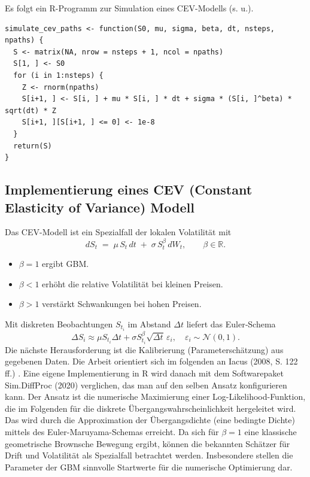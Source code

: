 \begin{bsp}[Implementierung]
Es folgt ein R-Programm zur Simulation eines CEV-Modells (s. u.).

\begin{lstlisting}
simulate_cev_paths <- function(S0, mu, sigma, beta, dt, nsteps, npaths) {
  S <- matrix(NA, nrow = nsteps + 1, ncol = npaths)
  S[1, ] <- S0
  for (i in 1:nsteps) {
    Z <- rnorm(npaths)
    S[i+1, ] <- S[i, ] + mu * S[i, ] * dt + sigma * (S[i, ]^beta) * sqrt(dt) * Z
    S[i+1, ][S[i+1, ] <= 0] <- 1e-8
  }
  return(S)
}
\end{lstlisting}

\end{bsp}

\subsection{Implementierung eines CEV (Constant Elasticity of Variance) Modell}
Das CEV-Modell ist ein Spezialfall der lokalen Volatilität mit
$$
dS_t \;=\; \mu\,S_t\,dt \;+\; \sigma\,S_t^{\beta}\,dW_t,\qquad \beta\in\mathbb R.
$$
\begin{itemize}
\item $\beta=1$ ergibt GBM. 
\item $\beta<1$ erhöht die relative Volatilität bei kleinen Preisen.
\item $\beta>1$ verstärkt Schwankungen bei hohen Preisen.
\end{itemize}
Mit diskreten Beobachtungen $S_{t_i}$ im Abstand $\Delta t$ liefert das Euler‑Schema
$$
\Delta S_i \approx \mu S_{t_i}\Delta t + \sigma S_{t_i}^{\beta}\sqrt{\Delta t}\,\varepsilon_i,\quad \varepsilon_i\sim\mathcal N(0,1).
$$
Die nächste Herausforderung ist die Kalibrierung (Parameterschätzung) aus gegebenen Daten. Die Arbeit 
orientiert sich im folgenden an Iacus (2008, S. 122 ff.) \cite{iacus2008}. Eine eigene Implementierung in
R wird danach mit dem Softwarepaket Sim.DiffProc \cite{rsde} (2020) verglichen, das man auf den selben Ansatz konfigurieren kann.
Der Ansatz ist die numerische Maximierung einer Log-Likelihood-Funktion, die im Folgenden für die diskrete Übergangswahrscheinlichkeit hergeleitet wird.
Das wird durch die Approximation der Übergangsdichte (eine bedingte Dichte) mittels des Euler-Maruyama-Schemas erreicht. Da sich für $\beta=1$ eine klassische geometrische Brownsche Bewegung ergibt, 
können die bekannten Schätzer für Drift und Volatilität als Spezialfall betrachtet werden. Insbesondere stellen die Parameter der GBM 
sinnvolle Startwerte für die numerische Optimierung dar.


